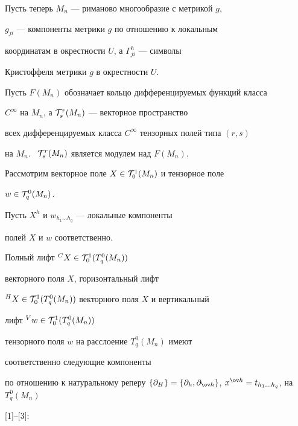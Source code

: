Пусть теперь $M_n$ --- риманово многообразие с метрикой $g$,


$g_{ji}$ --- компоненты метрики $g$ по отношению к локальным


координатам в окрестности $U$, а $\Gamma^h_{ji}$ --- символы


Кристоффеля метрики $g$ в окрестности $U$.


Пусть $F(M_n)$ обозначает кольцо дифференцируемых функций класса


$C^\infty$ на $M_n$, а ${\cal T}^r_s(M_n)$ --- векторное пространство


всех дифференцируемых класса $C^\infty$ тензорных полей типа $(r,s)$


на $M_n$. \ ${\cal T}^r_s(M_n)$ является модулем над  $F(M_n)$.


Рассмотрим векторное поле $X\in{\cal T}^1_0(M_n)$ и тензорное поле


$w\in{\cal T}^0_q(M_n)$.


Пусть $X^h$ и $w_{h_1\dotsc h_q}$ --- локальные компоненты


полей $X$ и $w$ соответственно.


Полный лифт ${}^CX\in{\cal T}^1_0(T^0_q(M_n))$


векторного поля $X$, горизонтальный лифт


${}^HX\in{\cal T}^1_0(T^0_q(M_n))$ векторного поля $X$ и вертикальный


лифт ${}^Vw\in{\cal T}^1_0(T^0_q(M_n))$


тензорного поля $w$ на расслоение $T^0_q(M_n)$ имеют


соответственно следующие компоненты


по отношению к натуральному реперу $\{\partial_H\}=\{\partial_h,


\partial_{\ov h}\}$, $x^{\ov h}=t_{h_1\dotsc h_q}$, на $T^0_q(M_n)$


[1]--[3]:


